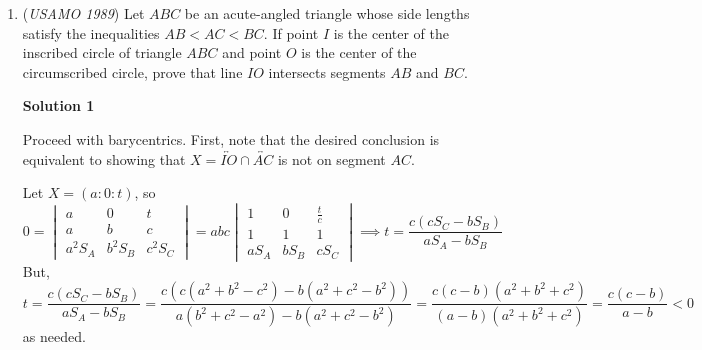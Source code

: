 \begin{enumerate}
 Since
 \[\lvert i- z_1 \rvert \cdot \lvert i - z_2 \rvert  \dotsm \lvert i - z_n \rvert = \lvert P(i) \rvert < 1,\]it follows that for some (not necessarily distinct) conjugates $z_i$ and $z_j$,
 \[\lvert z_i-i \rvert \cdot \lvert z_j-i \rvert < 1.\]Let $z_i = a+bi$ and $z_j = a-bi$, for real $a,b$.  We note that
 \[(a+b+1)^2 - (a+b-1)^2 = 4a + 4b .\]Thus
 \begin{align*} (a^2+b^2+1)^2 &= (a^2+b^2-1)^2 + 4a^2 + 4b^2 = \lvert a^2 + b^2 - 1 - 2ai \rvert ^2 + 4b^2 \\ &= \lvert (a-i)^2 - (bi)^2 \rvert^2 + 4b^2 \\ &= \bigl( \lvert a+bi - i \rvert \cdot \lvert a-bi -i \rvert \bigr)^2 + 4b^2 \\ &= \bigl( \lvert z_i - i \rvert \cdot \lvert z_j - i \rvert \bigr)^2 + 4b^2 < 1+4b^2. \end{align*}
Since $P(a+bi) = P(z_i) = 0$, these real numbers $a,b$ satisfy the problem's conditions.  $\blacksquare$



	\item (\textit{USAMO 1989}) Let $ABC$ be an acute-angled triangle whose side lengths satisfy the inequalities $AB < AC < BC$. If point $I$ is the center of the inscribed circle of triangle $ABC$ and point $O$ is the center of the circumscribed circle, prove that line $IO$ intersects segments $AB$ and $BC$.


 



\textbf{Solution 1}

Proceed with barycentrics. First, note that the desired conclusion is equivalent to showing that $X=\overleftrightarrow{IO} \cap \overleftrightarrow{AC}$ is not on segment $AC$. 

 Let $X=(a:0:t)$, so 
 \[0 = \begin{vmatrix} a & 0 & t \\ a & b & c \\ a^2S_A & b^2S_B & c^2S_C \end{vmatrix} = abc \begin{vmatrix} 1 & 0 & \frac{t}{c} \\ 1 & 1 & 1 \\ aS_A & bS_B & cS_C \end{vmatrix} \implies t=\frac{c(cS_C-bS_B)}{aS_A-bS_B}\]But, 
 \[t = \frac{c(cS_C-bS_B)}{aS_A-bS_B}=\frac{c(c(a^2+b^2-c^2)-b(a^2+c^2-b^2))}{a(b^2+c^2-a^2)-b(a^2+c^2-b^2)}=\frac{c(c-b)(a^2+b^2+c^2)}{(a-b)(a^2+b^2+c^2)}=\frac{c(c-b)}{a-b} < 0\]as needed.


\end{enumerate}
